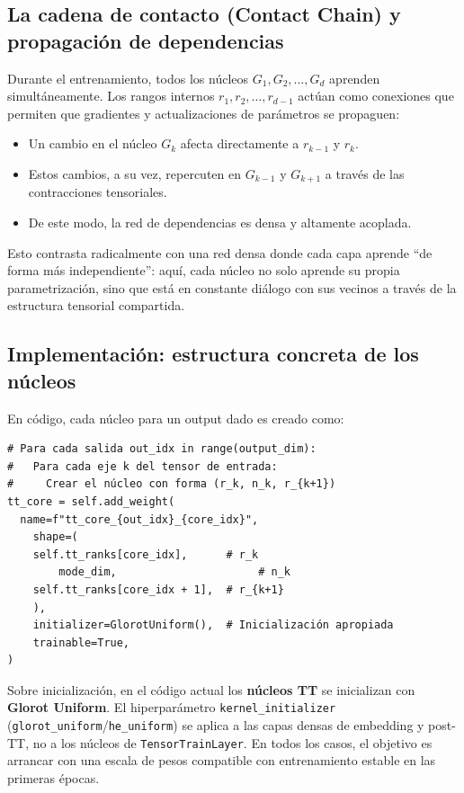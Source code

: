 \subsection{La cadena de contacto (Contact Chain) y propagación de dependencias}

Durante el entrenamiento, todos los núcleos $G_1, G_2, \ldots, G_d$ aprenden simultáneamente. Los rangos internos $r_1, r_2, \ldots, r_{d-1}$ actúan como conexiones que permiten que gradientes y actualizaciones de parámetros se propaguen:

\begin{itemize}
  \item Un cambio en el núcleo $G_k$ afecta directamente a $r_{k-1}$ y $r_k$.
  \item Estos cambios, a su vez, repercuten en $G_{k-1}$ y $G_{k+1}$ a través de las contracciones tensoriales.
  \item De este modo, la red de dependencias es densa y altamente acoplada.
\end{itemize}

Esto contrasta radicalmente con una red densa donde cada capa aprende ``de forma más independiente'': aquí, cada núcleo no solo aprende su propia parametrización, sino que está en constante diálogo con sus vecinos a través de la estructura tensorial compartida.

\subsection{Implementación: estructura concreta de los núcleos}

En código, cada núcleo para un output dado es creado como:

\begin{verbatim}
# Para cada salida out_idx in range(output_dim):
#   Para cada eje k del tensor de entrada:
#     Crear el núcleo con forma (r_k, n_k, r_{k+1})
tt_core = self.add_weight(
  name=f"tt_core_{out_idx}_{core_idx}",
    shape=(
    self.tt_ranks[core_idx],      # r_k
        mode_dim,                      # n_k  
    self.tt_ranks[core_idx + 1],  # r_{k+1}
    ),
    initializer=GlorotUniform(),  # Inicialización apropiada
    trainable=True,
)
\end{verbatim}

Sobre inicialización, en el código actual los \textbf{núcleos TT} se inicializan con \textbf{Glorot Uniform}. El hiperparámetro \texttt{kernel\_initializer} (\texttt{glorot\_uniform}/\texttt{he\_uniform}) se aplica a las capas densas de embedding y post-TT, no a los núcleos de \texttt{TensorTrainLayer}. En todos los casos, el objetivo es arrancar con una escala de pesos compatible con entrenamiento estable en las primeras épocas.

